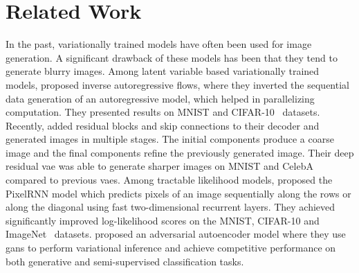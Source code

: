 \documentclass{article}
\begin{document}
\section{Related Work}
\label{sec:related-work}
In the past, variationally trained models have often been used for image generation. A significant drawback of these models has been that they tend to generate blurry images. Among latent variable based variationally trained models,  \citet{NIPS2016_iaf} proposed inverse autoregressive flows, where they inverted the sequential data generation of an autoregressive model, which helped in parallelizing computation. They presented results on MNIST \cite{lecun1998gradient} and CIFAR-10~\cite{krizhevsky2009cifar} datasets. Recently, \citet{deepresidualvae} added residual blocks \cite{he2016deep} and skip connections to their decoder and generated images in multiple stages. The initial components produce a coarse image and the final components refine the previously generated image. Their deep residual \gls{vae} was able to generate sharper images on MNIST and CelebA~\cite{Liu_2015_ICCV_celeba} compared to previous \glspl{vae}. Among tractable likelihood models, \citet{pixelrnn} proposed the PixelRNN model which predicts pixels of an image sequentially along the rows or along the diagonal using fast two-dimensional recurrent layers. They achieved significantly improved log-likelihood scores on the MNIST, CIFAR-10 and ImageNet~\cite{imagenet} datasets. \citet{makhzani_aae} proposed an adversarial autoencoder model where they use \glspl{gan} to perform variational inference and achieve competitive performance on both generative and semi-supervised classification tasks.
\end{document}
